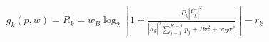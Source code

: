 \documentclass[preview]{standalone}
\begin{document}
\begin{align*}
g_k (p,w) = R_k = w_B \log_2 \left[1 + \frac{P_k \left|\hat{h_k}\right|^2}{\left|\hat{h_k}\right|^2 \sum_{j=1}^{K-1} {p_j} + P \sigma_{\epsilon}^2 + w_B \sigma^2}\right] - r_k
\end{align*}
\end{document}

